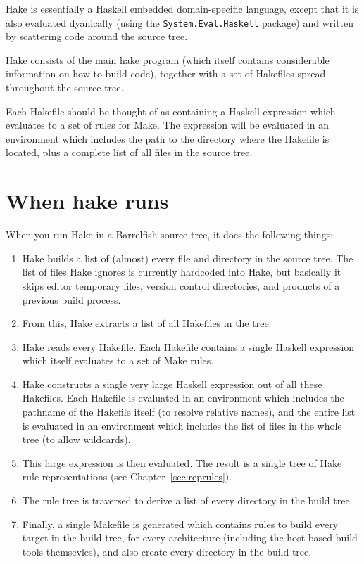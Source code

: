 \documentclass[a4paper,twoside]{report} %
\begin{document}
Hake is essentially a Haskell embedded domain-specific language,
except that it is also evaluated dyanically (using the
\texttt{System.Eval.Haskell} package) and written by scattering code
around the source tree. 

Hake consists of the main hake program (which itself contains
considerable information on how to build code), together with a set of
Hakefiles spread throughout the source tree.  

Each Hakefile should be thought of as containing a Haskell expression
which evaluates to a set of rules for Make.  The expression will be 
evaluated in an environment which includes the path to the directory
where the Hakefile is located, plus a complete list of all files in
the source tree. 

\section{When hake runs}

When you run Hake in a Barrelfish source tree, it does the following things:
\begin{enumerate}
\item Hake builds a list of (almost) every file and directory in the
  source tree.  The list of files Hake ignores is currently hardcoded
  into Hake, but basically it skips editor temporary files, version
  control directories, and products of a previous build process. 
\item From this, Hake extracts a list of all Hakefiles in the tree. 
\item Hake reads every Hakefile.  Each Hakefile contains a single
  Haskell expression which itself evaluates to a set of Make rules. 
\item Hake constructs a single very large Haskell expression out of
  all these Hakefiles.  Each Hakefile is evaluated in an environment
  which includes the pathname of the Hakefile itself (to resolve
  relative names), and the entire list is evaluated in an environment
  which includes the list of files in the whole tree (to allow
  wildcards). 
\item This large expression is then evaluated.  The result is a single
  tree of Hake rule representations (see
  Chapter~\ref{sec:reprules}). 
\item The rule tree is traversed to derive a list of every directory
  in the build tree.  
\item Finally, a single Makefile is generated which contains rules to
  build every target in the build tree, for every architecture
  (including the host-based build tools themsevles), and also create
  every directory in the build tree. 
\end{enumerate}
\end{document}
